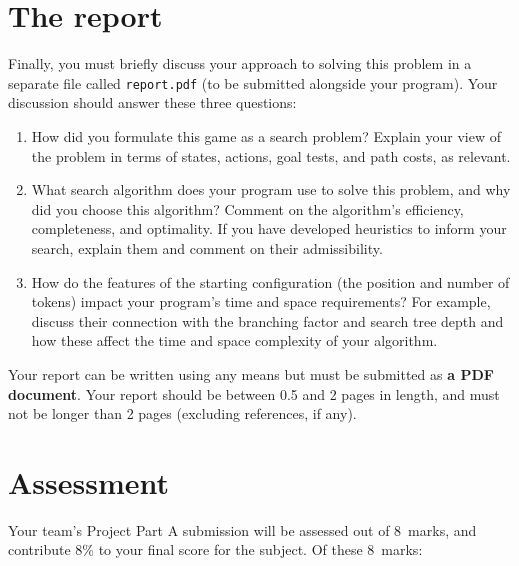 \documentclass[]{article}
\begin{document}
\section*{The report}

Finally, you must briefly discuss your approach to solving this problem
in a separate file called \texttt{report.pdf} (to be submitted alongside
your program). Your discussion should answer these three questions:
%
\begin{enumerate}
    \item
        How did you formulate this game as a search problem?
        Explain your view of the problem in terms of states, actions, goal
        tests, and path costs, as relevant.
    \item
        What search algorithm does your program use to solve this problem,
        and why did you choose this algorithm?
        Comment on the algorithm's efficiency, completeness, and optimality.
        If you have developed heuristics to inform your search, explain them
        and comment on their admissibility.
    \item
        How do the features of the starting configuration (the position and
        number of tokens) impact your program's time and space requirements?
        For example, discuss their connection with the branching factor and
        search tree depth and how these affect the time and space complexity
        of your algorithm.
\end{enumerate}
%
Your report can be written using any means but must be submitted as
\textbf{a PDF document}.
Your report should be between 0.5 and 2 pages in length, and must not
be longer than 2 pages (excluding references, if any).


\section*{Assessment}

Your team's Project Part A submission will be assessed out of 8~marks,
and contribute 8\% to your final score for the subject.
Of these 8~marks:
\end{document}
